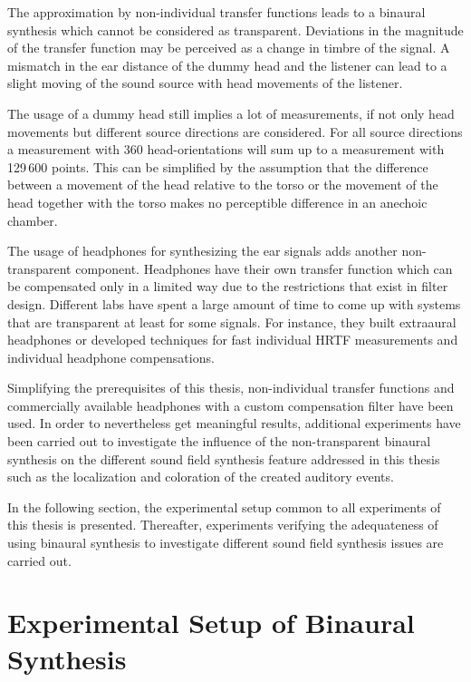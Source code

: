 The approximation by non-individual transfer functions leads to a binaural
synthesis which cannot be considered as transparent.
Deviations in the magnitude of the transfer function may
be perceived as a change in timbre of the signal.\autocite{Takanen2012}
A mismatch in
the ear distance of the dummy head and the listener can lead to a slight
moving of the sound source with head movements of the
listener.\autocite{Algazi2001b}

The usage of a dummy head still implies a lot of measurements,
if not only head movements but different source directions are considered.
For all source directions a measurement with 360 head-orientations will sum up to
a measurement with 129\,600 points. This can be simplified by the assumption
that the difference between a
movement of the head relative to the torso or the movement of the head together
with the torso makes no perceptible difference in an anechoic
chamber.\autocite{Popko2013}

The usage of headphones for synthesizing the ear signals adds
another non-transparent component. Headphones have their own transfer function
which can be compensated only in a limited way due to the restrictions that exist
in filter design. Different labs have spent a large amount of time to come up
with systems that are transparent at least for some signals.
For instance, they built extraaural
headphones\autocite{Erbes2013} or developed techniques for fast individual \ac{HRTF}
measurements and individual headphone compensations.\autocite{Masiero2012}

Simplifying the prerequisites of this thesis, non-individual transfer functions
and commercially available headphones with a custom compensation filter  have
been used. In order to nevertheless get meaningful results, additional
experiments have been carried out to investigate the influence of the non-transparent binaural
synthesis on the different sound field synthesis feature addressed in this thesis
such as the localization and coloration of the created auditory events.

In the following section, the experimental setup common to all experiments of
this thesis is presented. Thereafter, experiments verifying the adequateness
of using
binaural synthesis to investigate different sound field synthesis issues are carried out.


\section{Experimental Setup of Binaural Synthesis}
\label{sec:experimental_setup_of_binaural_synthesis}

